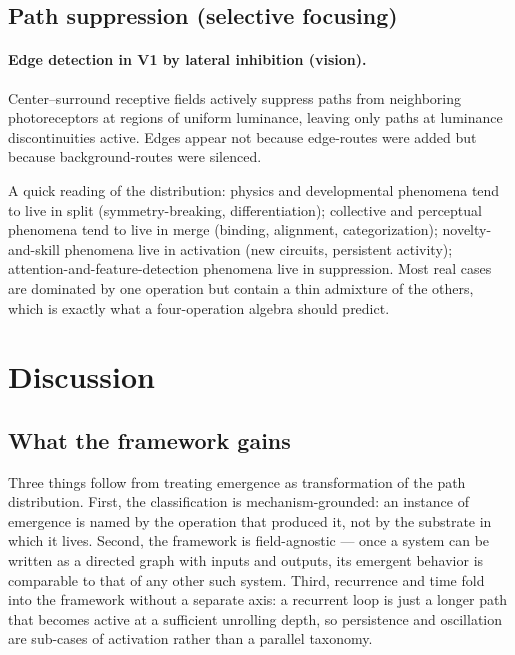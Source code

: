 \documentclass[11pt,a4paper]{article}
\begin{document}
\subsection{Path suppression (selective focusing)}

\paragraph{Edge detection in V1 by lateral inhibition (vision).}
Center--surround receptive fields actively suppress paths from
neighboring photoreceptors at regions of uniform luminance,
leaving only paths at luminance discontinuities active. Edges
appear not because edge-routes were added but because
background-routes were silenced.

A quick reading of the distribution: physics and developmental
phenomena tend to live in split (symmetry-breaking,
differentiation); collective and perceptual phenomena tend to
live in merge (binding, alignment, categorization);
novelty-and-skill phenomena live in activation (new circuits,
persistent activity); attention-and-feature-detection phenomena
live in suppression. Most real cases are dominated by one
operation but contain a thin admixture of the others, which is
exactly what a four-operation algebra should predict.

\section{Discussion}

\subsection{What the framework gains}

Three things follow from treating emergence as transformation of
the path distribution. First, the classification is
mechanism-grounded: an instance of emergence is named by the
operation that produced it, not by the substrate in which it lives.
Second, the framework is field-agnostic --- once a system can be
written as a directed graph with inputs and outputs, its
emergent behavior is comparable to that of any other such system.
Third, recurrence and time fold into the framework without a
separate axis: a recurrent loop is just a longer path that
becomes active at a sufficient unrolling depth, so persistence
and oscillation are sub-cases of activation rather than a
parallel taxonomy.
\end{document}
